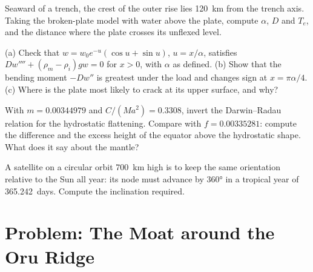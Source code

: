 \begin{exercise}[$\star\star$]\label{exo:b3:gravity-geodesy:9}
Seaward of a trench, the crest of the outer rise lies \qty{120}{km} from the
trench axis. Taking the broken-plate model with water above the plate, compute
$\alpha$, $D$ and $T_e$, and the distance where the plate crosses its unflexed
level.
\end{exercise}

\begin{exercise}[$\star\star\star$]\label{exo:b3:gravity-geodesy:10}
(a) Check that $w = w_0e^{-u}(\cos u + \sin u)$, $u = x/\alpha$, satisfies
$Dw'''' + (\rho_m - \rho_i)gw = 0$ for $x > 0$, with $\alpha$ as defined.
(b) Show that the bending moment $-Dw''$ is greatest under the load and changes
sign at $x = \pi\alpha/4$. (c) Where is the plate most likely to crack at its
upper surface, and why?
\end{exercise}

\begin{exercise}[$\star\star\star$]\label{exo:b3:gravity-geodesy:11}
With $m = \num{0.00344979}$ and $C/(Ma^2) = \num{0.3308}$, invert the
Darwin--Radau relation for the hydrostatic flattening. Compare with
$f = \num{0.00335281}$: compute the difference and the excess height of the
equator above the hydrostatic shape. What does it say about the mantle?
\end{exercise}

\begin{exercise}[$\star\star\star$]\label{exo:b3:gravity-geodesy:12}
A satellite on a circular orbit \qty{700}{km} high is to keep the same
orientation relative to the Sun all year: its node must advance by \ang{360} in
a tropical year of \num{365.242}~days. Compute the inclination required.
\end{exercise}

\section{Problem: The Moat around the Oru Ridge}

